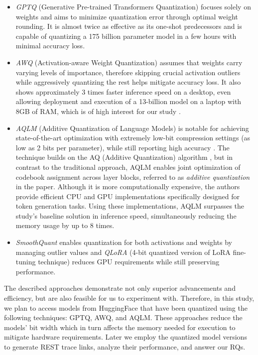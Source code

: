 \documentclass[conference]{IEEEtran}
\begin{document}
\begin{itemize}

\item \textit{GPTQ} (Generative Pre-trained Transformers Quantization) focuses solely on weights and aims to minimize quantization error through optimal weight rounding. It is almost twice as effective as its one-shot predecessors and is capable of quantizing a 175 billion parameter model in a few hours with minimal accuracy loss\cite{frantar2023GPTQ}. 

\item \textit{AWQ} (Activation-aware Weight Quantization) assumes that weights carry varying levels of importance, therefore skipping crucial activation outliers while aggressively quantizing the rest helps mitigate accuracy loss. It also shows approximately 3 times faster inference speed on a desktop, even allowing deployment and execution of a 13-billion model on a laptop with 8GB of RAM, which is of high interest for our study \cite{lin2024AWQ}.

\item \textit{AQLM} (Additive Quantization of Language Models) is notable for achieving state-of-the-art optimization with extremely low-bit compression settings (as low as 2 bits per parameter), while still reporting high accuracy \cite{egiazarian2024AQLM}. The technique builds on the AQ (Additive Quantization) algorithm \cite{babenko2014additive}, but in contrast to the traditional approach, AQLM enables joint optimization of codebook assignment across layer blocks, referred to as \textit{additive quantization} in the paper. Although it is more computationally expensive, the authors provide efficient CPU and GPU implementations specifically designed for token generation tasks. Using these implementations, AQLM surpasses the study's baseline solution in inference speed, simultaneously reducing the memory usage by up to 8 times. 

\item \textit{SmoothQuant} \cite{xiao2023SmoothQuant} enables quantization for both activations and weights by managing outlier values and \textit{QLoRA} (4-bit quantized version of LoRA fine-tuning technique) \cite{dettmers2023qlora} reduces GPU requirements while still preserving performance.
\end{itemize}

The described approaches demonstrate not only superior advancements and efficiency, but are also feasible for us to experiment with. Therefore, in this study, we plan to access models from HuggingFace that have been quantized using the following techniques: GPTQ, AWQ, and AQLM. These approaches reduce the models' bit width which in turn affects the memory needed for execution to mitigate hardware requirements. Later we employ the quantized model versions to generate REST trace links, analyze their performance, and answer our RQs. 
\end{document}
